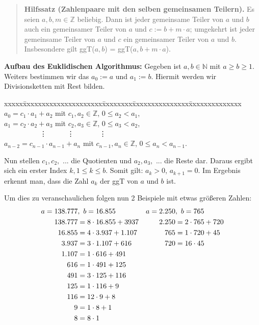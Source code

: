 \documentclass[12pt,a4paper]{article}
\theoremstyle{definition}
\begin{document}
\begin{quote}
\small
\textbf{Hilfssatz (Zahlenpaare mit den selben gemeinsamen Teilern).}
Es seien $a, b, m \in \mathbb{Z}$ beliebig. Dann ist jeder gemeinsame Teiler von $a$ und $b$ auch ein gemeinsamer Teiler von $a$ und $c := b + m \cdot a$; umgekehrt ist jeder gemeinsame Teiler von $a$ und $c$ ein gemeinsamer Teiler von $a$ und $b$.
Insbesondere gilt ggT($a, b$) = ggT($a, b + m \cdot a$).\newline
\autocite[17]{RempeGillen2009}\newpage
\end{quote}
\textbf{Aufbau des Euklidischen Algorithmus:}\newline
Gegeben ist $a, b \in \mathbb{N}$ mit $a \ge b \ge 1$.
Weiters bestimmen wir das $a_0 := a$ und $a_1 := b$.
Hiermit werden wir Divisionsketten mit Rest bilden.
\begin{tabbing}
xxxxx\=xxxxxxxxxxxxxxxxxxxxx\=xxxxxxxx\=xxxxxxxxxxxxxxx\=xxxxxxxxxxxxxx\kill
\> $a_0 = c_1 \cdot a_1 + a_2$             \> mit \> $c_1, a_2 \in \mathbb{Z}$,     \> $0 \le a_2 < a_1$,  \\
\> $a_1 = c_2 \cdot a_2 + a_3$             \> mit \> $c_2, a_3 \in \mathbb{Z}$,     \> $0 \le a_3 < a_2$,  \\
\> \ \ \ \ \ \ \ \ \ \ \vdots              \>     \>\ \ \ \ \ \vdots                \>\ \ \ \ \ \ \ \vdots \\
\> $a_{n-2} = c_{n-1} \cdot a_{n-1} + a_n$ \> mit \> $c_{n-1}, a_n \in \mathbb{Z}$, \> $0 \le a_n < a_{n-1}$.
\end{tabbing}
Nun stellen $c_1, c_2,$ ... die Quotienten und $a_2, a_3,$ ... die Reste dar. Daraus ergibt sich ein erster Index $k, 1 \le k \le b$.
Somit gilt: $a_k > 0$, $a_{k+1} = 0$.\newline
Im Ergebnis erkennt man, dass die Zahl $a_k$ der ggT von $a$ und $b$ ist.

Um dies zu veranschaulichen folgen nun 2 Beispiele mit etwas größeren Zahlen:
\begin{align}\setcounter{equation}{-1}
a = 138.777 &,\ b = 16.855       & a = 2.250 &,\ b = 765 \\
138.777 &= 8 \cdot 16.855 + 3937 & 2.250 &= 2 \cdot 765 + 720 \\
16.855  &= 4 \cdot 3.937 + 1.107 & 765   &= 1 \cdot 720 + 45 \\
3.937   &= 3 \cdot 1.107 + 616   & 720   &= 16 \cdot 45 \\
1.107   &= 1 \cdot 616 + 491     &  \\
616     &= 1 \cdot 491 + 125     &  \\
491     &= 3 \cdot 125 + 116     &  \\
125     &= 1 \cdot 116 + 9       &  \\
116     &= 12 \cdot 9 + 8        &  \\
9       &= 1 \cdot 8 + 1         &  \\
8       &= 8 \cdot 1
\end{align}
\end{document}
